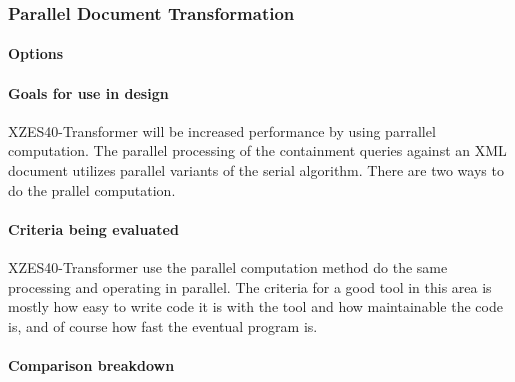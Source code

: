 \subsubsection{Parallel Document Transformation}

\paragraph{Options}

\paragraph{Goals for use in design}

XZES40-Transformer will be increased performance by using parrallel computation.
The parallel processing of the containment queries against an XML document utilizes parallel variants of the serial algorithm.
There are two ways to do the prallel computation.


\paragraph{Criteria being evaluated}

XZES40-Transformer use the parallel computation method do the same processing and operating in parallel.
The criteria for a good tool in this area is mostly how easy to write code it is with the tool and how maintainable the code is, and of course how fast the eventual program is.

\paragraph{Comparison breakdown}

